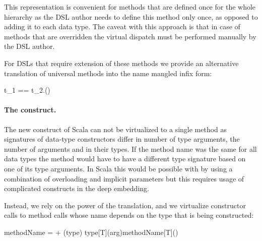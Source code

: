   This representation is convenient for methods that are defined once for the whole hierarchy as
  the DSL author needs to define this method only once, as opposed to adding it to each data type. The caveat with
  this approach is that in case of methods that are overridden the virtual dispatch must be
  performed manually by the DSL author.

  For DSLs that require extension of these methods we provide an alternative translation
  of universal methods into the name mangled infix form:%

  \infyyax{}
      {t_1\; == \;t_2}{.\;\mathtt{\$==}(\;)}

  \paragraph{The  construct.} The new construct of Scala can not be
  virtualized to a single method as signatures of data-type constructors differ in number
   of type arguments, the number of arguments and in their types. If the method name was the
   same for all data types the method would have to have a different type signature based on
   one of its type arguments. In Scala this would be possible with by using a combination of
   overloading and implicit parameters but this requires usage of complicated constructs in the deep embedding.


   Instead, we rely on the power of the translation, and we virtualize constructor calls
     to method calls whose name depends on the type that is being constructed:

  \infyy{}
      {\tctx{\Gamma} methodName =  + (type)}
      { \; type[T](arg)}{methodName[T]()}

